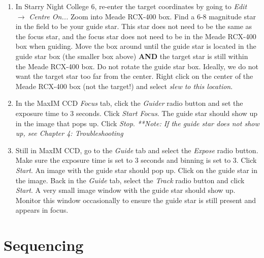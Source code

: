 \documentclass[11pt]{report}
\begin{document}
\begin{enumerate}
\item In Starry Night College 6, re-enter the target coordinates by going to \emph{Edit} {$\rightarrow$} \emph{Centre On...} Zoom into Meade RCX-400 box. Find a 6-8 magnitude star in the field to be your guide star. This star does not need to be the same as the focus star, and the focus star does not need to be in the Meade RCX-400 box when guiding. Move the box around until the guide star is located in the guide star box (the smaller box above)  {\bf AND} the target star is still within the Meade RCX-400 box. Do not rotate the guide star box. Ideally, we do not want the target star too far from the center. Right click on the center of the Meade RCX-400 box (not the target!) and select \emph{slew to this location}.
\item In the MaxIM CCD \emph{Focus} tab, click the \emph{Guider} radio button and set the exposure time to 3 seconds. Click \emph{Start Focus}. The guide star should show up in the image that pops up. Click \emph{Stop}. \emph{**Note: If the guide star does not show up, see Chapter 4: Troubleshooting}
\item Still in MaxIM CCD, go to the \emph{Guide} tab and select the \emph{Expose} radio button. Make sure the exposure time is set to 3 seconds and binning is set to 3. Click \emph{Start}. An image with the guide star should pop up. Click on the guide star in the image. Back in the \emph{Guide} tab, select the \emph{Track} radio button and click \emph{Start}. A very small image window with the guide star should show up. Monitor this window occasionally to ensure the guide star is still present and appears in focus. 
\end{enumerate}

\section{Sequencing}
\end{document}
